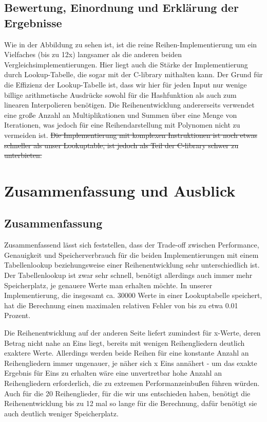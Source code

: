 \documentclass[course=erap] {aspdoc}
\begin{document}
     \subsection{Bewertung, Einordnung und Erklärung der Ergebnisse}
     Wie in der Abbildung zu sehen ist, ist die reine Reihen-Implementierung um ein Vielfaches (bis zu 12x) langsamer als die anderen
     beiden Vergleichsimplementierungen.
     Hier liegt auch die Stärke der Implementierung durch Lookup-Tabelle, die sogar mit der C-library mithalten kann.
     Der Grund für die Effizienz der Lookup-Tabelle ist, dass wir hier für jeden
     Input nur wenige billige arithmetische Ausdrücke sowohl für die Hashfunktion als auch zum linearen Interpolieren benötigen.
     Die Reihenentwicklung andererseits verwendet eine große Anzahl an Multiplikationen und Summen über eine Menge von Iterationen, was jedoch für eine Reihendarstellung mit Polynomen nicht zu vermeiden ist.
     \sout{Die Implementierung mit komplexen Instruktionen ist noch etwas schneller als unser Lookuptable, ist jedoch als Teil der
     C-library schwer zu unterbieten.}
 
     \section{Zusammenfassung und Ausblick}
     \subsection{Zusammenfassung}
     Zusammenfassend lässt sich feststellen, dass der Trade-off zwischen Performance, Genauigkeit und Speicherverbrauch für die beiden Implementierungen mit einem Tabellenlookup beziehungsweise einer Reihenentwicklung sehr unterschiedlich ist.
     Der Tabellenlookup ist zwar sehr schnell, benötigt allerdings auch immer mehr Speicherplatz, je genauere Werte man erhalten möchte.
     In unserer Implementierung, die insgesamt ca. 30000 Werte in einer Lookuptabelle speichert, hat die Berechnung einen maximalen relativen Fehler von bis zu etwa 0.01 Prozent.
 
     Die Reihenentwicklung auf der anderen Seite liefert zumindest für x-Werte, deren Betrag nicht nahe an Eins liegt, bereits mit wenigen Reihengliedern deutlich exaktere Werte.
     Allerdings werden beide Reihen für eine konstante Anzahl an Reihengliedern immer ungenauer, je näher sich x Eins annähert - um das exakte Ergebnis für Eins zu erhalten wäre eine unvertretbar hohe Anzahl an Reihengliedern erforderlich, die zu extremen Performanzeinbußen führen würden.
     Auch für die 20 Reihenglieder, für die wir uns entschieden haben, benötigt die Reihenentwicklung bis zu 12 mal so lange für die Berechnung, dafür benötigt sie auch deutlich weniger Speicherplatz.
 
\end{document}

